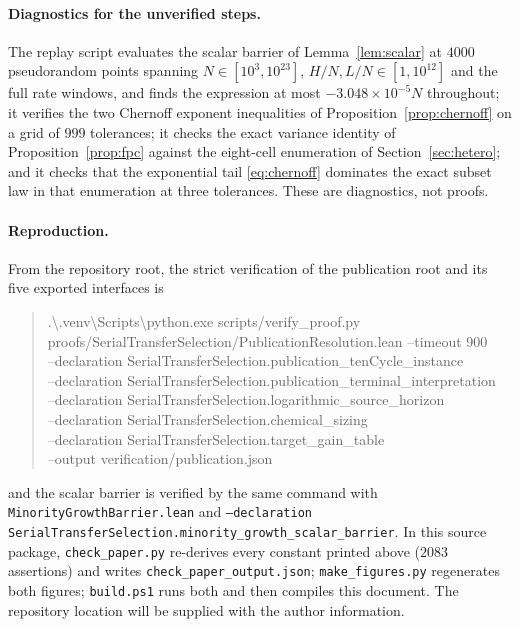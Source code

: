 \documentclass[11pt,a4paper]{article}
\newcommand{\RepositoryNote}{The repository location will be supplied with the author information.}
\theoremstyle{plain}
\theoremstyle{definition}
\theoremstyle{remark}
\begin{document}
\paragraph{Diagnostics for the unverified steps.}
The replay script evaluates the scalar barrier of Lemma~\ref{lem:scalar} at
$4000$ pseudorandom points spanning $N\in[10^3,10^{23}]$,
$H/N,L/N\in[1,10^{12}]$ and the full rate windows, and finds the expression at
most $-3.048\times10^{-5}N$ throughout; it verifies the two Chernoff exponent
inequalities of Proposition~\ref{prop:chernoff} on a grid of $999$ tolerances;
it checks the exact variance identity of Proposition~\ref{prop:fpc} against the
eight-cell enumeration of Section~\ref{sec:hetero}; and it checks that the
exponential tail \eqref{eq:chernoff} dominates the exact subset law in that
enumeration at three tolerances. These are diagnostics, not proofs.

\paragraph{Reproduction.}
From the repository root, the strict verification of the publication root and
its five exported interfaces is
\begin{quote}\footnotesize\ttfamily
.\textbackslash.venv\textbackslash Scripts\textbackslash python.exe scripts/verify\_proof.py \\
\hspace*{1em}proofs/SerialTransferSelection/PublicationResolution.lean --timeout 900 \\
\hspace*{1em}--declaration SerialTransferSelection.publication\_tenCycle\_instance \\
\hspace*{1em}--declaration SerialTransferSelection.publication\_terminal\_interpretation \\
\hspace*{1em}--declaration SerialTransferSelection.logarithmic\_source\_horizon \\
\hspace*{1em}--declaration SerialTransferSelection.chemical\_sizing \\
\hspace*{1em}--declaration SerialTransferSelection.target\_gain\_table \\
\hspace*{1em}--output verification/publication.json
\end{quote}
and the scalar barrier is verified by the same command with
\texttt{MinorityGrowthBarrier.lean} and
\texttt{--declaration SerialTransferSelection.minority\_growth\_scalar\_barrier}.
In this source package, \texttt{check\_paper.py} re-derives every constant
printed above ($2083$ assertions) and writes
\texttt{check\_paper\_output.json}; \texttt{make\_figures.py} regenerates both
figures; \texttt{build.ps1} runs both and then compiles this document.
\RepositoryNote
\end{document}
